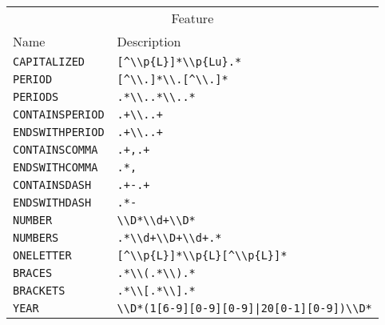 \begin{table}[h!]
\centering
\begin{tabular}{l l}
  \toprule
  \multicolumn{2}{c}{Feature}\\
   Name                   & Description\\
  \midrule
   \texttt{CAPITALIZED}     &\verb$[^\\p{L}]*\\p{Lu}.*$\\
   \texttt{PERIOD}          &\verb$[^\\.]*\\.[^\\.]*$\\
   \texttt{PERIODS}         &\verb$.*\\..*\\..*$\\
   \texttt{CONTAINSPERIOD}  &\verb$.+\\..+$\\
   \texttt{ENDSWITHPERIOD}  &\verb$.+\\..+$\\
   \texttt{CONTAINSCOMMA}   &\verb$.+,.+$\\
   \texttt{ENDSWITHCOMMA}   &\verb$.*,$\\
   \texttt{CONTAINSDASH}    &\verb$.+-.+$\\
   \texttt{ENDSWITHDASH}    &\verb$.*-$\\
   \texttt{NUMBER}          &\verb$\\D*\\d+\\D*$\\
   \texttt{NUMBERS}         &\verb$.*\\d+\\D+\\d+.*$\\
   \texttt{ONELETTER}       &\verb$[^\\p{L}]*\\p{L}[^\\p{L}]*$\\
   \texttt{BRACES}          &\verb$.*\\(.*\\).*$\\
   \texttt{BRACKETS}        &\verb$.*\\[.*\\].*$\\
   \texttt{YEAR}            &\verb$\\D*(1[6-9][0-9][0-9]|20[0-1][0-9])\\D*$\\

\end{tabular}
\end{table}
